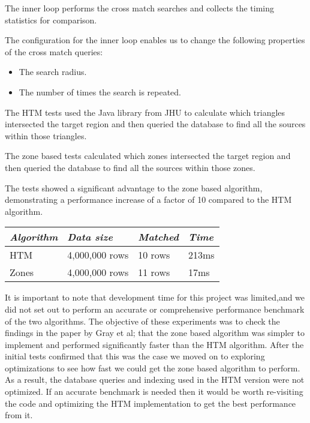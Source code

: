 \documentclass{article}
\begin{document}
The inner loop performs the cross match searches and collects the timing statistics for comparison. 

The configuration for the inner loop enables us to change the following properties of the cross match queries:

\begin{itemize}
    \item The search radius.
    \item The number of times the search is repeated.
\end{itemize}


The HTM tests used the Java library from JHU to calculate which triangles intersected the target region and then queried the database to find all the sources within those triangles.

The zone based tests calculated which zones intersected the target region and then queried the database to find all the sources within those zones.

The tests showed a significant advantage to the zone based algorithm, demonstrating a performance increase of a factor of 10 compared to the HTM algorithm.

\begin{table}[h]
\centering
\begin{tabular}{|l|l|l|l|}
\hline
\textit{Algorithm} & \textit{Data size} & \textit{Matched} & \textit{Time}  \\ \hline
HTM   & 4,000,000 rows & 10 rows & 213ms \\ \hline
Zones & 4,000,000 rows & 11 rows & 17ms  \\ \hline
\end{tabular}
\end{table}

It is important to note that development time for this project was limited,and we did not set out to perform an accurate or comprehensive performance benchmark of the two algorithms.
The objective of these experiments was to check the findings in the paper by Gray et al; that the zone based algorithm was simpler to implement and performed significantly faster than the HTM algorithm.
After the initial tests confirmed that this was the case we moved on to exploring optimizations to see how fast we could get the zone based algorithm to perform.
As a result, the database queries and indexing used in the HTM version were not optimized.
If an accurate benchmark is needed then it would be worth re-visiting the code and optimizing the HTM implementation to get the best performance from it.
\end{document}
